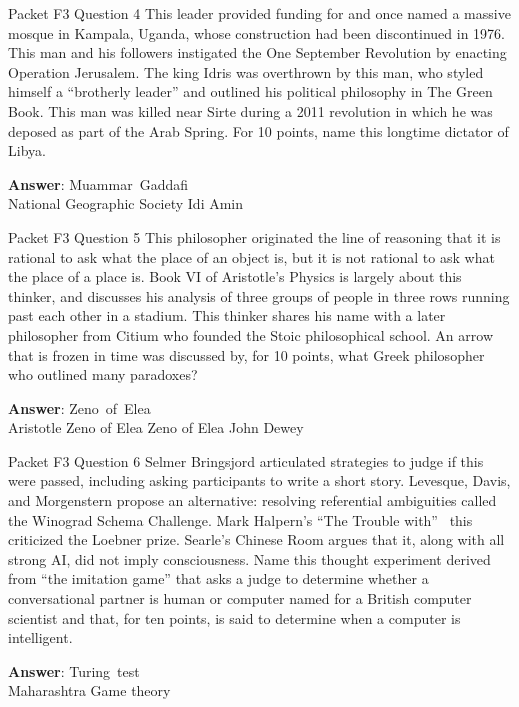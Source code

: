 \begin{frame}{Packet F3 Question 4}
This leader provided funding for and once   named a massive mosque in Kampala, Uganda, whose construction   had been discontinued in 1976. This man and his followers instigated the One September Revolution by enacting Operation Jerusalem. The king Idris was overthrown   by this man, who styled himself a “brotherly leader” and outlined his political philosophy in The Green Book. This man   was killed near Sirte   during a 2011 revolution in which he was deposed as part of the Arab Spring.   For 10 points, name this longtime dictator of Libya.

\textbf{Answer}: Muammar\ Gaddafi\\
 National Geographic Society
 Idi Amin
\end{frame}

\begin{frame}{Packet F3 Question 5}
This philosopher originated the line of reasoning that it is rational to ask what the place of an object is, but it is not rational to ask what the place of a place is. Book VI of Aristotle’s Physics is largely about this thinker, and discusses his analysis of three groups of people in three rows running past each other in a stadium. This thinker shares his name with a later philosopher from Citium who founded the Stoic philosophical school. An arrow that is frozen in time was discussed by, for 10 points, what Greek philosopher who outlined   many paradoxes?      

\textbf{Answer}: Zeno\ of\ Elea\\
 Aristotle
 Zeno of Elea
 Zeno of Elea
 John Dewey
\end{frame}

\begin{frame}{Packet F3 Question 6}
Selmer Bringsjord articulated strategies to judge if this were passed, including asking   participants to   write a short story. Levesque, Davis, and Morgenstern propose an alternative: resolving referential ambiguities called the Winograd Schema Challenge. Mark Halpern’s “The Trouble with” ~this~ criticized the Loebner prize. Searle’s Chinese   Room argues that it, along with all strong AI, did not imply consciousness. Name this thought experiment derived from “the imitation game” that     asks a judge to determine whether a conversational partner   is human or computer named for a British computer scientist and that, for ten points, is said to determine when a computer is intelligent.

\textbf{Answer}: Turing\ test\\
 Maharashtra
 Game theory
\end{frame}

